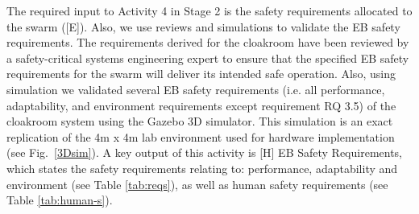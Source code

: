 \documentclass[runningheads]{llncs}
\begin{document}
The required input to Activity 4 in Stage 2 is the safety requirements allocated to the swarm ([E]). 
Also, we use reviews and simulations to validate the EB safety requirements. 
The requirements derived for the cloakroom have been reviewed by a safety-critical systems engineering expert to ensure that the specified EB safety requirements for the swarm will deliver its intended safe operation. 
Also, using simulation we validated several EB safety requirements (i.e. all performance, adaptability, and environment requirements except requirement RQ 3.5) of the cloakroom system using the Gazebo 3D simulator. 
This simulation is an exact replication of the 4m x 4m lab environment used for hardware implementation (see Fig.~\ref{3Dsim}). 
A key output of this activity is [H] EB Safety Requirements, which states the safety requirements relating to: performance, adaptability and environment (see Table \ref{tab:reqs}), as well as human safety requirements (see Table \ref{tab:human-s}).



\end{document}
